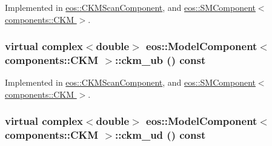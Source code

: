Implemented in \hyperlink{classeos_1_1CKMScanComponent_ab2927bf32ec2c0b8ec13aca97b932129}{eos::CKMScanComponent}, and \hyperlink{classeos_1_1SMComponent_3_01components_1_1CKM_01_4_a8b1562be6dd88747f3a0cb59c1679d8e}{eos::SMComponent$<$ components::CKM $>$}.\hypertarget{classeos_1_1ModelComponent_3_01components_1_1CKM_01_4_a71547bad7b092be1631067f270056acd}{
\subsubsection[{ckm\_\-ub}]{\setlength{\rightskip}{0pt plus 5cm}virtual complex$<$double$>$ eos::ModelComponent$<$ components::CKM $>$::ckm\_\-ub () const}}
\label{classeos_1_1ModelComponent_3_01components_1_1CKM_01_4_a71547bad7b092be1631067f270056acd}


Implemented in \hyperlink{classeos_1_1CKMScanComponent_ace753216c0814e933038548ed237d74b}{eos::CKMScanComponent}, and \hyperlink{classeos_1_1SMComponent_3_01components_1_1CKM_01_4_a8f787b6796f087fb64d1349c564fd72d}{eos::SMComponent$<$ components::CKM $>$}.\hypertarget{classeos_1_1ModelComponent_3_01components_1_1CKM_01_4_a56044f519ef2befa09d4912cb8f9188a}{
\subsubsection[{ckm\_\-ud}]{\setlength{\rightskip}{0pt plus 5cm}virtual complex$<$double$>$ eos::ModelComponent$<$ components::CKM $>$::ckm\_\-ud () const}}
\label{classeos_1_1ModelComponent_3_01components_1_1CKM_01_4_a56044f519ef2befa09d4912cb8f9188a}


